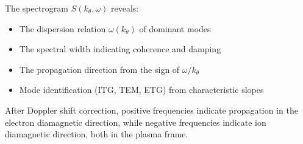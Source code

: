 \documentclass[11pt,a4paper]{article}
\begin{document}
The spectrogram $S(k_\theta, \omega)$ reveals:
\begin{itemize}
    \item The dispersion relation $\omega(k_\theta)$ of dominant modes
    \item The spectral width indicating coherence and damping
    \item The propagation direction from the sign of $\omega/k_\theta$
    \item Mode identification (ITG, TEM, ETG) from characteristic slopes
\end{itemize}

After Doppler shift correction, positive frequencies indicate propagation in the electron diamagnetic direction, while negative frequencies indicate ion diamagnetic direction, both in the plasma frame.
\end{document}

